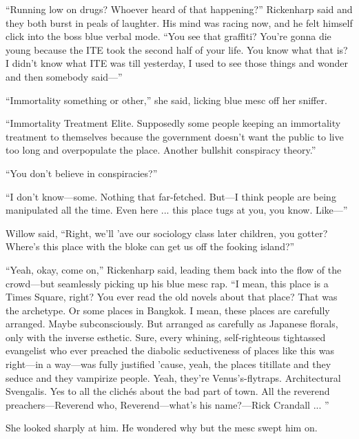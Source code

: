 ``Running low on drugs? Whoever heard of that happening?'' Rickenharp said and they both burst in peals of laughter. His mind was racing now, and he felt himself click into the boss blue verbal mode. ``You see that graffiti? You're gonna die young because the ITE took the second half of your life. You know what that is? I didn't know what ITE was till yesterday, I used to see those things and wonder and then somebody said—''

``Immortality something or other,'' she said, licking blue mesc off her sniffer.

``Immortality Treatment Elite. Supposedly some people keeping an immortality treatment to themselves because the government doesn't want the public to live too long and overpopulate the place. Another bullshit conspiracy theory.''

``You don't believe in conspiracies?''

``I don't know—some. Nothing that far-fetched. But—I think people are being manipulated all the time. Even here ... this place tugs at you, you know. Like—''

Willow said, ``Right, we'll 'ave our sociology class later children, you gotter? Where's this place with the bloke can get us off the fooking island?''

``Yeah, okay, come on,'' Rickenharp said, leading them back into the flow of the crowd—but seamlessly picking up his blue mesc rap. ``I mean, this place is a Times Square, right? You ever read the old novels about that place? That was the archetype. Or some places in Bangkok. I mean, these places are carefully arranged. Maybe subconsciously. But arranged as carefully as Japanese florals, only with the inverse esthetic. Sure, every whining, self-righteous tightassed evangelist who ever preached the diabolic seductiveness of places like this was right—in a way—was fully justified 'cause, yeah, the places titillate and they seduce and they vampirize people. Yeah, they're Venus's-flytraps. Architectural Svengalis. Yes to all the clichés about the bad part of town. All the reverend preachers—Reverend who, Reverend—what's his name?—Rick Crandall ... ''

She looked sharply at him. He wondered why but the mesc swept him on.

